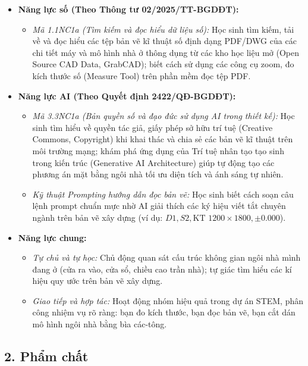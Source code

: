\documentclass[12pt, a4paper]{article}
\begin{document}
\begin{itemize}[leftmargin=1.2cm]
    \item \textbf{Năng lực số (Theo Thông tư 02/2025/TT-BGDĐT):}
    \begin{itemize}[leftmargin=0.6cm]
        \item \textit{Mã 1.1NC1a (Tìm kiếm và đọc hiểu dữ liệu số):} Học sinh tìm kiếm, tải về và đọc hiểu các tệp bản vẽ kĩ thuật số định dạng PDF/DWG của các chi tiết máy và mô hình nhà ở thông dụng từ các kho học liệu mở (Open Source CAD Data, GrabCAD); biết cách sử dụng các công cụ zoom, đo kích thước số (Measure Tool) trên phần mềm đọc tệp PDF.
    \end{itemize}

    \item \textbf{Năng lực AI (Theo Quyết định 2422/QĐ-BGDĐT):}
    \begin{itemize}[leftmargin=0.6cm]
        \item \textit{Mã 3.3NC1a (Bản quyền số và đạo đức sử dụng AI trong thiết kế):} Học sinh tìm hiểu về quyền tác giả, giấy phép sở hữu trí tuệ (Creative Commons, Copyright) khi khai thác và chia sẻ các bản vẽ kĩ thuật trên môi trường mạng; khám phá ứng dụng của Trí tuệ nhân tạo tạo sinh trong kiến trúc (Generative AI Architecture) giúp tự động tạo các phương án mặt bằng ngôi nhà tối ưu diện tích và ánh sáng tự nhiên.
        \item \textit{Kỹ thuật Prompting hướng dẫn đọc bản vẽ:} Học sinh biết cách soạn câu lệnh prompt chuẩn mực nhờ AI giải thích các ký hiệu viết tắt chuyên ngành trên bản vẽ xây dựng (ví dụ: $D1, S2, \text{KT } 1200 \times 1800, \pm 0.000$).
    \end{itemize}

    \item \textbf{Năng lực chung:}
    \begin{itemize}[leftmargin=0.6cm]
        \item \textit{Tự chủ và tự học:} Chủ động quan sát cấu trúc không gian ngôi nhà mình đang ở (cửa ra vào, cửa sổ, chiều cao trần nhà); tự giác tìm hiểu các kí hiệu quy ước trên bản vẽ xây dựng.
        \item \textit{Giao tiếp và hợp tác:} Hoạt động nhóm hiệu quả trong dự án STEM, phân công nhiệm vụ rõ ràng: bạn đo kích thước, bạn đọc bản vẽ, bạn cắt dán mô hình ngôi nhà bằng bìa các-tông.
    \end{itemize}
\end{itemize}

\subsection*{2. Phẩm chất}
\end{document}
